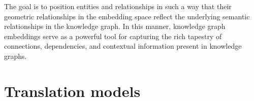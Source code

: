 The goal is to position entities and relationships in such a way that their geometric relationships in the embedding space reflect the underlying semantic relationships in the knowledge graph. In this manner, knowledge graph embeddings serve as a powerful tool for capturing the rich tapestry of connections, dependencies, and contextual information present in knowledge graphs.








\section{Translation models}\label{sec:emb-translations}

